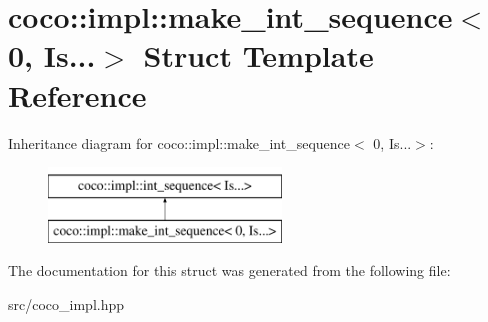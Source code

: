 \hypertarget{structcoco_1_1impl_1_1make__int__sequence_3_010_00_01_is_8_8_8_4}{}\section{coco\+:\+:impl\+:\+:make\+\_\+int\+\_\+sequence$<$ 0, Is...$>$ Struct Template Reference}
\label{structcoco_1_1impl_1_1make__int__sequence_3_010_00_01_is_8_8_8_4}
Inheritance diagram for coco\+:\+:impl\+:\+:make\+\_\+int\+\_\+sequence$<$ 0, Is...$>$\+:\begin{figure}[H]
\begin{center}
\leavevmode
\includegraphics[height=2.000000cm]{structcoco_1_1impl_1_1make__int__sequence_3_010_00_01_is_8_8_8_4}
\end{center}
\end{figure}


The documentation for this struct was generated from the following file\+:\begin{DoxyCompactItemize}
\item 
src/coco\+\_\+impl.\+hpp\end{DoxyCompactItemize}
